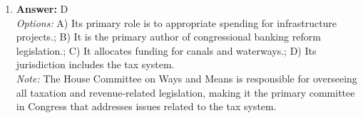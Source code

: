 \documentclass[12pt]{article}
\begin{document}
\begin{enumerate}[label=\arabic*.]
\\ \textit{Note:} The swift adoption of the Bill of Rights reflects the states' concerns about the potential for federal overreach and the need to protect individual liberties against an overpowerful national government, which was a central issue during the ratification debates of the Constitution.
\item \textbf{Answer:} D
\\ \textit{Options:} A) Its primary role is to appropriate spending for infrastructure projects.; B) It is the primary author of congressional banking reform legislation.; C) It allocates funding for canals and waterways.; D) Its jurisdiction includes the tax system.
\\ \textit{Note:} The House Committee on Ways and Means is responsible for overseeing all taxation and revenue-related legislation, making it the primary committee in Congress that addresses issues related to the tax system.
\end{enumerate}
\end{document}
